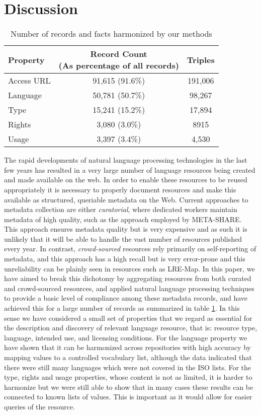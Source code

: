 \documentclass[11pt]{article}
\begin{document}
\section{Discussion}
\label{discussion}

\begin{table}
    \begin{tabular}{l|cc}
        Property   &  \thead{Record Count\\(As percentage of all records)} & Triples \\
        \hline
        Access URL &  91,615 (91.6\%) & 191,006  \\
        Language   &  50,781 (50.7\%) & 98,267   \\
        Type       &  15,241 (15.2\%) & 17,894   \\
        Rights     &   3,080 (3.0\%)  & 8915     \\
        Usage      &   3,397 (3.4\%)  & 4,530    \\ 
    \end{tabular}
    \caption{\label{tab:total}Number of records and facts harmonized by our
    methods}
\end{table}
        



The rapid developments of natural language processing technologies in the last
few years has resulted in a very large number of language resources being
created and made available on the web. In order to enable these resources to be
reused appropriately it is necessary to properly document resources and make
this available as structured, queriable metadata on the Web. Current approaches
to metadata collection are either \emph{curatorial}, where dedicated workers
maintain metadata of high quality, such as the approach employed by META-SHARE.
This approach ensures metadata quality but is very expensive and as such it is
unlikely that it will be able to handle the vast number of resources published
every year. In contrast, \emph{crowd-sourced} resources rely primarily on
self-reporting of metadata, and this approach has a high recall but is very
error-prone and this unreliability can be plainly seen in resources such as
LRE-Map. In this paper, we have aimed to break this dichotomy by aggregating
resources from both curated and crowd-sourced resources, and applied natural language
processing techniques to provide a basic level of compliance among these
metadata records, and have achieved this for a large number of records as
summarized in table \ref{tab:total}. In this sense we have considered a small
set of properties that we regard as essential for the description and discovery
of relevant language resource, that is: resource type, language, intended use,
and licensing conditions.  For the
language property we have shown that it can be harmonized across repositories
with high accuracy by mapping values to a controlled vocabulary list, although
the data indicated that there were still many languages which were not covered
in the ISO lists. For the type, rights and usage properties, whose content is
not as limited, it is harder to harmonize but we were still able to show that in
many cases these results can be connected to known lists of values. This is
important as it would allow for easier queries of the resource. 
\end{document}
